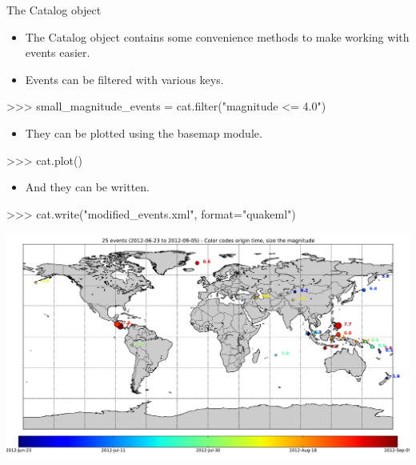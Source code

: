 \documentclass[handout]{beamer}
\begin{document}
\begin{frame}{The Catalog object}
    \begin{itemize}
        \item The Catalog object contains some convenience methods to make working with events easier.
        \item Events can be filtered with various keys.
    \end{itemize}
\begin{myColorBox}{0.95}{}
\begin{python}
>>> small_magnitude_events = cat.filter("magnitude <= 4.0")
\end{python}
\end{myColorBox}

    \begin{itemize}
        \item They can be plotted using the basemap module.
    \end{itemize}
\begin{myColorBox}{0.95}{}
\begin{python}
    >>> cat.plot()
\end{python}
\end{myColorBox}
    \begin{itemize}
        \item And they can be written.
    \end{itemize}
\begin{myColorBox}{0.95}{}
\begin{python}
>>> cat.write("modified_events.xml", format="quakeml")
\end{python}
\end{myColorBox}
\end{frame}


\begin{frame}[plain]
\includegraphics[width=\textwidth]{events.pdf}
\end{frame}
\end{document}
